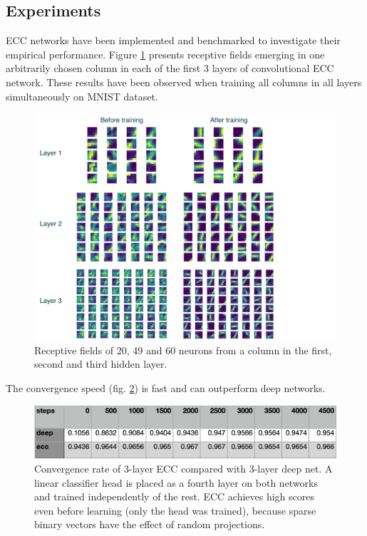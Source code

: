 \documentclass[12pt]{article}
\begin{document}
\subsection{Experiments}

ECC networks have been implemented and benchmarked to investigate their empirical performance. Figure \ref{fig:receptive_fields} presents receptive fields emerging in one arbitrarily chosen column in each of the first 3 layers of convolutional ECC network. These results have been observed when training all columns in all layers simultaneously on MNIST dataset. 
\begin{figure}[!htbp]
	\centering
	\includegraphics[width=15cm]{receptive_fields}
	\caption{Receptive fields of 20, 49 and 60 neurons from a column in the first, second and third hidden layer.}
	\label{fig:receptive_fields}
\end{figure} 
The convergence speed (fig. \ref{fig:convergence_rate}) is fast and can outperform deep networks.
\begin{figure}[!htbp]
	\centering
	\includegraphics[width=13.5cm]{convergence_rate}
	\caption{Convergence rate of 3-layer ECC compared with 3-layer deep net. A linear classifier head is placed as a fourth layer on both networks and trained independently of the rest. ECC achieves high scores even before learning (only the head was trained), because sparse binary vectors have the effect of random projections.}
	\label{fig:convergence_rate}
\end{figure} 
\end{document}

